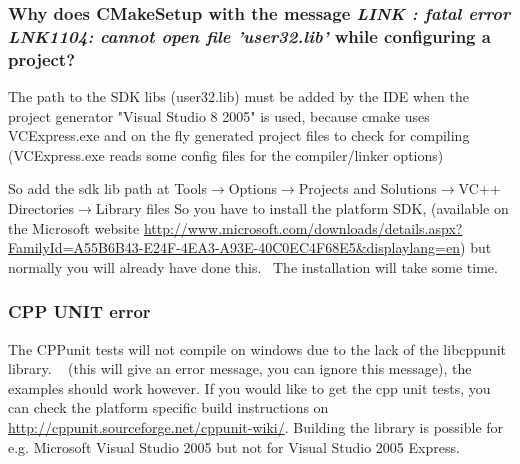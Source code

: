 \documentclass[a4paper,10pt]{article}
\begin{document}
\subsubsection{Why does CMakeSetup with the message \emph{LINK : fatal error LNK1104: cannot open 
file 'user32.lib'} while configuring a project?}
The path to the SDK libs (user32.lib) must be added by the IDE when the 
project generator "Visual Studio 8 2005" is used, because cmake uses 
VCExpress.exe and on the fly generated project files to check for compiling 
(VCExpress.exe reads some config files for the compiler/linker options) 

So add the sdk lib path  at Tools$\rightarrow$Options$\rightarrow$Projects and Solutions$\rightarrow$VC++ Directories$\rightarrow$Library files
So you have to install the platform SDK, (available on the Microsoft website \url{http://www.microsoft.com/downloads/details.aspx?FamilyId=A55B6B43-E24F-4EA3-A93E-40C0EC4F68E5&displaylang=en}) but 
normally you will already have done this.  The installation will take some 
time.

\subsubsection{CPP UNIT error}
The CPPunit tests will not compile on windows due to the lack of the libcppunit  library.   (this will give an error message, you can ignore this message), the examples should work however.
If you would like to get the cpp unit tests, you can check the platform specific build instructions on \url{http://cppunit.sourceforge.net/cppunit-wiki/}. Building the library is possible for e.g. Microsoft Visual Studio 2005 but not for Visual Studio 2005 Express.
\end{document}
